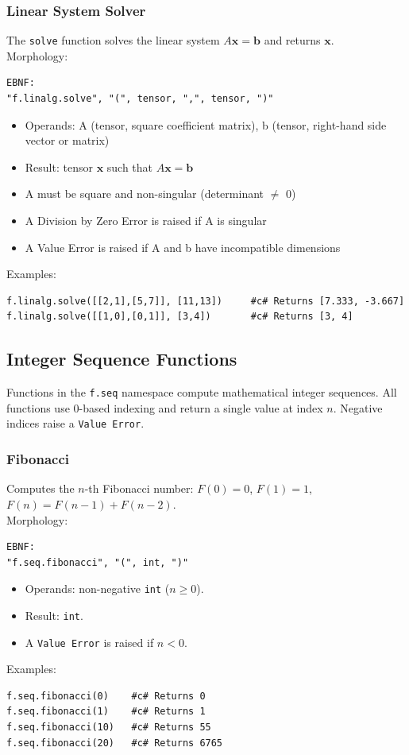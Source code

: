 \subsubsection{Linear System Solver}
The \texttt{solve} function solves the linear system $A\mathbf{x} = \mathbf{b}$ and returns $\mathbf{x}$.\\
Morphology:
\begin{verbatim}
EBNF:
"f.linalg.solve", "(", tensor, ",", tensor, ")"
\end{verbatim}
\begin{itemize}
\item Operands: A (tensor, square coefficient matrix), b (tensor, right-hand side vector or matrix)
\item Result: tensor $\mathbf{x}$ such that $A\mathbf{x} = \mathbf{b}$
\item A must be square and non-singular (determinant $\neq$ 0)
\item A Division by Zero Error is raised if A is singular
\item A Value Error is raised if A and b have incompatible dimensions
\end{itemize}
Examples:
\begin{verbatim}
f.linalg.solve([[2,1],[5,7]], [11,13])     #c# Returns [7.333, -3.667]
f.linalg.solve([[1,0],[0,1]], [3,4])       #c# Returns [3, 4]
\end{verbatim}


\subsection{Integer Sequence Functions}
Functions in the \texttt{f.seq} namespace compute mathematical integer sequences. All functions use 0-based indexing and return a single value at index $n$. Negative indices raise a \texttt{Value Error}.

\subsubsection{Fibonacci}
Computes the $n$-th Fibonacci number: $F(0) = 0$, $F(1) = 1$, $F(n) = F(n-1) + F(n-2)$.\\
Morphology:
\begin{verbatim}
EBNF:
"f.seq.fibonacci", "(", int, ")"
\end{verbatim}
\begin{itemize}
\item Operands: non-negative \texttt{int} ($n \geq 0$).
\item Result: \texttt{int}.
\item A \texttt{Value Error} is raised if $n < 0$.
\end{itemize}
Examples:
\begin{verbatim}
f.seq.fibonacci(0)    #c# Returns 0
f.seq.fibonacci(1)    #c# Returns 1
f.seq.fibonacci(10)   #c# Returns 55
f.seq.fibonacci(20)   #c# Returns 6765
\end{verbatim}

